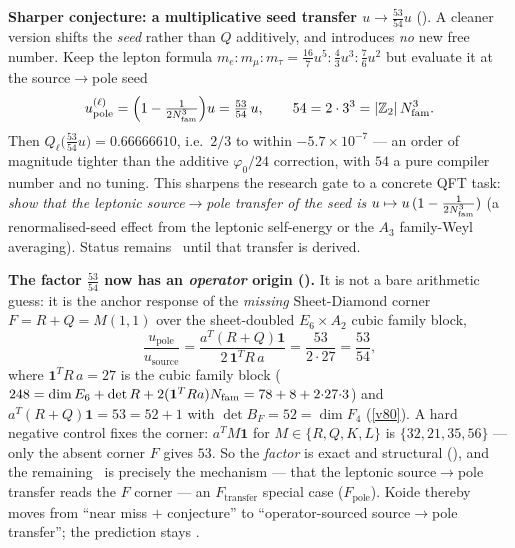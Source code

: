 \par\smallskip\noindent\textbf{Sharper conjecture: a multiplicative seed transfer $u\to\tfrac{53}{54}u$} (\mC).
A cleaner version shifts the \emph{seed} rather than $Q$ additively, and introduces \emph{no} new free
number. Keep the lepton formula $m_e{:}m_\mu{:}m_\tau=\tfrac{16}7u^5{:}\tfrac43u^3{:}\tfrac76u^2$ but
evaluate it at the source$\to$pole seed
\[
  u_{\mathrm{pole}}^{(\ell)}=\Bigl(1-\tfrac{1}{2N_{\mathrm{fam}}^3}\Bigr)u=\tfrac{53}{54}\,u,\qquad
  54=2\cdot3^3=|\mathbb{Z}_2|\,N_{\mathrm{fam}}^3 .
\]
Then $Q_\ell\bigl(\tfrac{53}{54}u\bigr)=0.66666610$, i.e.\ $2/3$ to within $-5.7\times10^{-7}$ ---
an order of magnitude tighter than the additive $\varphi_0/24$ correction, with $54$ a pure compiler
number and no tuning. This sharpens the research gate to a concrete QFT task: \emph{show that the
leptonic source$\to$pole transfer of the seed is $u\mapsto u\,(1-\tfrac{1}{2N_{\mathrm{fam}}^3})$} (a renormalised-seed
effect from the leptonic self-energy or the $A_3$ family-Weyl averaging). Status remains \mC\ until that
transfer is derived. 
\par\smallskip\noindent\textbf{The factor $\tfrac{53}{54}$ now has an \emph{operator} origin
().} It is not a bare arithmetic guess: it is the anchor
response of the \emph{missing} Sheet-Diamond corner $F=R+Q=M(1,1)$ over the sheet-doubled $E_6{\times}A_2$
cubic family block,
\[
  \frac{u_{\mathrm{pole}}}{u_{\mathrm{source}}}=\frac{a^T(R+Q)\mathbf1}{2\,\mathbf1^T R\,a}
  =\frac{53}{2\cdot27}=\frac{53}{54},
\]
where $\mathbf1^T R\,a=27$ is the cubic family block ($248=\dim E_6+\det R+2(\mathbf1^T R a)N_{\mathrm{fam}}
=78+8+2{\cdot}27{\cdot}3$) and $a^T(R+Q)\mathbf1=53=52+1$ with $\det B_F=52=\dim F_4$
(\vref{v80}). A hard negative control fixes the corner: $a^T M\mathbf1$ for $M\in\{R,Q,K,L\}$ is
$\{32,21,35,56\}$ --- only the absent corner $F$ gives $53$. So the \emph{factor} is exact and
structural (\mE), and the remaining \mC\ is precisely the mechanism --- that the leptonic
source$\to$pole transfer reads the $F$ corner --- an $F_{\mathrm{transfer}}$ special case
($F_{\mathrm{pole}}$). Koide thereby moves from ``near miss $+$ conjecture'' to
``operator-sourced source$\to$pole transfer''; the prediction stays \mC.

